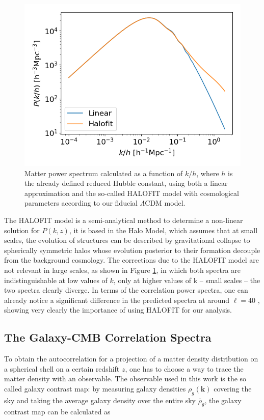 \documentclass[openany,a4paper,12pt,oneside]{book}
\begin{document}
\begin{spacing}{1.5}
\begin{figure}[!htb]
    \centering
    \includegraphics[width=.75\linewidth]{Imagens/Pk_3dmatter_LCDM.png}
    \caption{Matter power spectrum calculated as a function of $k/h$, where $h$ is the already defined reduced Hubble constant, using both a linear approximation and the so-called HALOFIT model \cite{Halofit2020} with cosmological parameters according to our fiducial $\Lambda$CDM model.}
    \label{fig:matter_PS}
\end{figure}

The HALOFIT model is a semi-analytical method to determine a non-linear solution for $P(k,z)$, it is based in the Halo Model, which assumes that at small scales, the evolution of structures can be described by gravitational collapse to spherically symmetric halos whose evolution posterior to their formation decouple from the background cosmology. The corrections due to the HALOFIT model are not relevant in large scales, as shown in Figure \ref{fig:matter_PS}, in which both spectra are indistinguishable at low values of $k$, only at higher values of k -- small scales -- the two spectra clearly diverge. In terms of the correlation power spectra, one can already notice a significant difference in the predicted spectra at around $\ell=40$ \cite{Moura-Santos_2016}, showing very clearly the importance of using HALOFIT for our analysis.

\subsection{The Galaxy-CMB Correlation Spectra}\label{ch2:correlations}

To obtain the autocorrelation for a projection of a matter density distribution on a spherical shell on a certain redshift $z$, one has to choose a way to trace the matter density with an observable. The observable used in this work is the so called galaxy contrast map: by measuring galaxy densities $\rho_g(\mathbf{k})$ covering the sky and taking the average galaxy density over the entire sky $\bar{\rho}_g$, the galaxy contrast map can be calculated as


\end{spacing}
\end{document}
